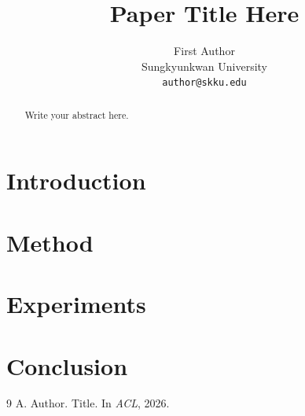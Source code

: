 \documentclass[11pt]{article}
\title{Paper Title Here}
\author{First Author \\
  Sungkyunkwan University \\
  \texttt{author@skku.edu}}
\begin{document}
\maketitle

\begin{abstract}
Write your abstract here.
\end{abstract}

\section{Introduction}

\section{Method}

\section{Experiments}

\section{Conclusion}

\begin{thebibliography}{9}
 A. Author. Title. In \emph{ACL}, 2026.
\end{thebibliography}
\end{document}
